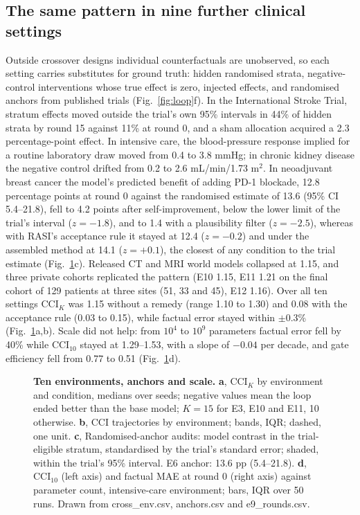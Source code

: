 \documentclass[11pt,a4paper]{article}
\newcommand{\CCI}{\mathrm{CCI}}
\begin{document}
\subsection{The same pattern in nine further clinical settings}
Outside crossover designs individual counterfactuals are unobserved, so each setting carries substitutes for ground truth: hidden randomised strata, negative-control interventions whose true effect is zero, injected effects, and randomised anchors from published trials (Fig.~\ref{fig:loop}f). In the International Stroke Trial\cite{ist2011}, stratum effects moved outside the trial's own 95\% intervals in 44\% of hidden strata by round 15 against 11\% at round 0, and a sham allocation acquired a 2.3 percentage-point effect. In intensive care, the blood-pressure response implied for a routine laboratory draw moved from 0.4 to 3.8 mmHg; in chronic kidney disease the negative control drifted from 0.2 to 2.6 mL/min/1.73 m$^2$. In neoadjuvant breast cancer the model's predicted benefit of adding PD-1 blockade, 12.8 percentage points at round 0 against the randomised estimate of 13.6 (95\% CI 5.4--21.8)\cite{keynote522}, fell to 4.2 points after self-improvement, below the lower limit of the trial's interval ($z=-1.8$), and to 1.4 with a plausibility filter ($z=-2.5$), whereas with RASI's acceptance rule it stayed at 12.4 ($z=-0.2$) and under the assembled method at 14.1 ($z=+0.1$), the closest of any condition to the trial estimate (Fig.~\ref{fig:cross}c). Released CT and MRI world models\cite{yang2025mewm,brainiac2026} collapsed at 1.15, and three private cohorts replicated the pattern (E10 1.15, E11 1.21 on the final cohort of 129 patients at three sites (51, 33 and 45), E12 1.16). Over all ten settings $\CCI_K$ was 1.15 without a remedy (range 1.10 to 1.30) and 0.08 with the acceptance rule (0.03 to 0.15), while factual error stayed within $\pm0.3$\% (Fig.~\ref{fig:cross}a,b). Scale did not help: from $10^4$ to $10^9$ parameters factual error fell by 40\% while $\CCI_{10}$ stayed at 1.29--1.53, with a slope of $-0.04$ per decade, and gate efficiency fell from 0.77 to 0.51 (Fig.~\ref{fig:cross}d).

\begin{figure}[!htbp]\centering
{}
\caption{\textbf{Ten environments, anchors and scale.} \textbf{a}, $\CCI_K$ by environment and condition, medians over seeds; negative values mean the loop ended better than the base model; $K=15$ for E3, E10 and E11, 10 otherwise. \textbf{b}, CCI trajectories by environment; bands, IQR; dashed, one unit. \textbf{c}, Randomised-anchor audits: model contrast in the trial-eligible stratum, standardised by the trial's standard error; shaded, within the trial's 95\% interval. E6 anchor: 13.6 pp (5.4--21.8). \textbf{d}, $\CCI_{10}$ (left axis) and factual MAE at round 0 (right axis) against parameter count, intensive-care environment; bars, IQR over 50 runs. Drawn from cross\_env.csv, anchors.csv and e9\_rounds.csv. }\label{fig:cross}
\end{figure}
\FloatBarrier
\end{document}
